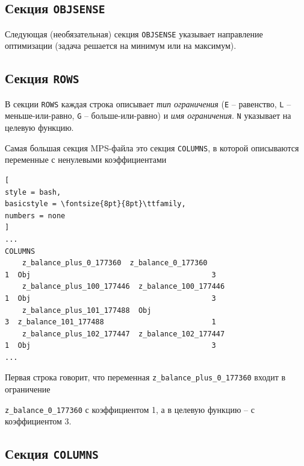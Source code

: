 \documentclass[%
	11pt,
	a4paper,
	utf8,
		]{article}
\begin{document}
\subsection{Секция \texttt{OBJSENSE}}

Следующая (необязательная) секция \verb|OBJSENSE| указывает направление оптимизации (задача решается на минимум или на максимум).

\subsection{Секция \texttt{ROWS}}

В секции \verb|ROWS| каждая строка описывает \emph{тип ограничения} (\verb|E| -- равенство, \verb|L| -- меньше-или-равно, \verb|G| -- больше-или-равно) и \emph{имя ограничения}. \verb|N| указывает на целевую функцию.

Самая большая секция MPS-файла это секция \verb|COLUMNS|, в которой описываются переменные с ненулевыми коэффициентами
\begin{lstlisting}[
style = bash,
basicstyle = \fontsize{8pt}{8pt}\ttfamily,
numbers = none
]
...
COLUMNS
    z_balance_plus_0_177360  z_balance_0_177360                           1  Obj                                          3
    z_balance_plus_100_177446  z_balance_100_177446                         1  Obj                                          3
    z_balance_plus_101_177488  Obj                                          3  z_balance_101_177488                         1
    z_balance_plus_102_177447  z_balance_102_177447                         1  Obj                                          3
...
\end{lstlisting}

Первая строка говорит, что переменная \verb|z_balance_plus_0_177360| входит в ограничение

\noindent\verb|z_balance_0_177360| с коэффициентом 1, а в целевую функцию -- с коэффициентом 3.

\subsection{Секция \texttt{COLUMNS}}
\end{document}
